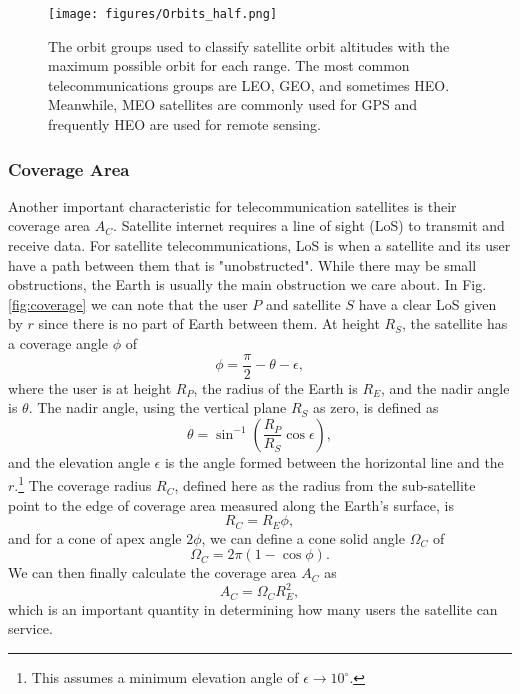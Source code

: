 \documentclass[10pt]{article}
\begin{document}
\begin{figure}[h!]
\centering
\texttt{[image: figures/Orbits\_half.png]}
\caption{The orbit groups used to classify satellite orbit altitudes with the maximum possible orbit for each range. The most common telecommunications groups are LEO, GEO, and sometimes HEO. Meanwhile, MEO satellites are commonly used for GPS and frequently HEO are used for remote sensing\cite{Types_of_orbits}.}
\label{fig:orbits}
\end{figure}

\subsubsection{Coverage Area}
\label{coverage_area}

Another important characteristic for telecommunication satellites is their coverage area $A_C$. Satellite internet requires a line of sight (LoS) to transmit and receive data. For satellite telecommunications, LoS is when a satellite and its user have a path between them that is "unobstructed". While there may be small obstructions, the Earth is usually the main obstruction we care about. In Fig. \ref{fig:coverage} we can note that the user $P$ and satellite $S$ have a clear LoS given by $r$ since there is no part of Earth between them. At height $R_S$, the satellite has a coverage angle $\phi$ of
\begin{equation}
\phi = \frac{\pi}{2} - \theta - \epsilon,
    \label{eq:coverage_angle}
\end{equation}
where the user is at height $R_P$, the radius of the Earth is $R_E$, and the nadir angle is $\theta$. The nadir angle, using the vertical plane $R_S$ as zero, is defined as 
\begin{equation}
\theta = \sin^{-1}(\frac{R_P}{R_S}\cos\epsilon),
    \label{eq:nadir_angle}
\end{equation}
and the elevation angle $\epsilon$ is the angle formed between the horizontal line and the $r$.\footnote{This assumes a minimum elevation angle of $\epsilon \rightarrow 10^\circ$.} The coverage radius $R_C$, defined here as the radius from the sub-satellite point to the edge of coverage area measured along the Earth’s surface, is
\begin{equation}
R_C = R_E \phi,
    \label{eq:coverage_radius}
\end{equation}
and for a cone of apex angle $2\phi$, we can define a cone solid angle $\Omega_C$ of
\begin{equation}
\Omega_C = 2\pi (1 - \cos\phi).
    \label{eq:cone_solid_angle}
\end{equation}
We can then finally calculate the coverage area $A_C$ as
\begin{equation}
A_C = \Omega_C R_E^2,
    \label{eq:coverage_area}
\end{equation}
which is an important quantity in determining how many users the satellite can service.
\end{document}
